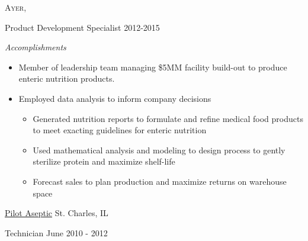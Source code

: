 \documentclass[10pt,a4paper]{article} %
\begin{document}
{\textsc{Ayer, }} {

\headedsubsection %
{Product Development Specialist}
{2012-2015}
	{
\emph{Accomplishments }
\begin{itemize}
\item Member of leadership team managing \$5MM facility build-out to produce enteric nutrition products. 
\item Employed data analysis to inform company decisions 
    \begin{itemize}
    \item Generated nutrition reports to formulate and refine medical food products to meet exacting guidelines for enteric nutrition 
    \item Used mathematical analysis and modeling to design process to gently sterilize protein and maximize shelf-life 
    \item Forecast sales to plan production and maximize returns on warehouse space 
    \end{itemize}

\end{itemize}
	}
}

\headedsection %
{\href{http://}{Pilot Aseptic}}
{St. Charles, IL} {

\headedsubsection %
{Technician}
{June 2010 - 2012}
{
}}

\end{document}
